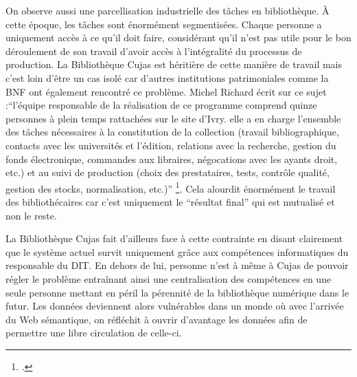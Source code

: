 On observe aussi une parcellisation industrielle des tâches en bibliothèque. À cette époque, les tâches sont énormément segmentisées. Chaque personne a uniquement accès à ce qu'il doit faire, considérant qu'il n'est pas utile pour le bon déroulement de son travail d'avoir accès à l'intégralité du processus de production. La Bibliothèque Cujas est héritière de cette manière de travail mais c'est loin d'être un cas isolé car d'autres institutions patrimoniales comme la \ac{BNF} ont également rencontré ce problème. Michel Richard écrit sur ce sujet :\enquote{l'équipe responsable de la réalisation de ce programme comprend quinze personnes à plein temps rattachées sur le site d'Ivry. elle a en charge l'ensemble des tâches nécessaires à la constitution de la collection (travail bibliographique, contacts avec les universités et l'édition, relations avec la recherche, gestion du fonds électronique, commandes aux libraires, négocations avec les ayants droit, etc.) et au suivi de production (choix des prestataires, tests, contrôle qualité, gestion des stocks, normalisation, etc.)} \footcite{bermesTroisAgesNumerique}. Cela alourdit énormément le travail des bibliothécaires car c'est uniquement le \enquote{résultat final} qui est mutualisé et non le reste.  

La Bibliothèque Cujas fait d'ailleurs face à cette contrainte en disant clairement que le système actuel survit uniquement grâce aux compétences informatiques du responsable du \ac{DIT}. En dehors de lui, personne n'est à même à Cujas de pouvoir régler le problème entraînant ainsi une centralisation des compétences en une seule personne mettant en péril la pérennité de la bibliothèque numérique dans le futur. Les données deviennent alors vulnérables dans un monde où avec l'arrivée du Web sémantique, on réfléchit à ouvrir d'avantage les données afin de permettre une libre circulation de celle-ci.